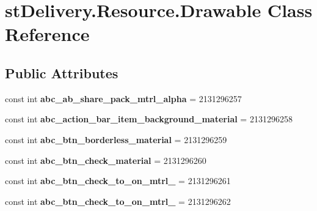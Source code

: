 \hypertarget{classst_delivery_1_1_resource_1_1_drawable}{}\section{st\+Delivery.\+Resource.\+Drawable Class Reference}
\label{classst_delivery_1_1_resource_1_1_drawable}
\subsection*{Public Attributes}
\begin{DoxyCompactItemize}
\item 
\mbox{\label{classst_delivery_1_1_resource_1_1_drawable_a4204e8843bc8901a44dc85309bde59ec}} 
const int {\bfseries abc\+\_\+ab\+\_\+share\+\_\+pack\+\_\+mtrl\+\_\+alpha} = 2131296257
\item 
\mbox{\label{classst_delivery_1_1_resource_1_1_drawable_a37fd07e0444c8e5ce24e82a473105e49}} 
const int {\bfseries abc\+\_\+action\+\_\+bar\+\_\+item\+\_\+background\+\_\+material} = 2131296258
\item 
\mbox{\label{classst_delivery_1_1_resource_1_1_drawable_a71a317588d81b1286124d3f8971105c7}} 
const int {\bfseries abc\+\_\+btn\+\_\+borderless\+\_\+material} = 2131296259
\item 
\mbox{\label{classst_delivery_1_1_resource_1_1_drawable_a4d2999d9cf0a805e7b8e0cc4fb9e9fd5}} 
const int {\bfseries abc\+\_\+btn\+\_\+check\+\_\+material} = 2131296260
\item 
\mbox{\label{classst_delivery_1_1_resource_1_1_drawable_a8aceb77f812eb85a59bc804dbda0e38c}} 
const int {\bfseries abc\+\_\+btn\+\_\+check\+\_\+to\+\_\+on\+\_\+mtrl\+\_} = 2131296261
\item 
\mbox{\label{classst_delivery_1_1_resource_1_1_drawable_afb8e82182ff448c5295b7998f6bc42c6}} 
const int {\bfseries abc\+\_\+btn\+\_\+check\+\_\+to\+\_\+on\+\_\+mtrl\+\_} = 2131296262
\item 

\end{DoxyCompactItemize}
